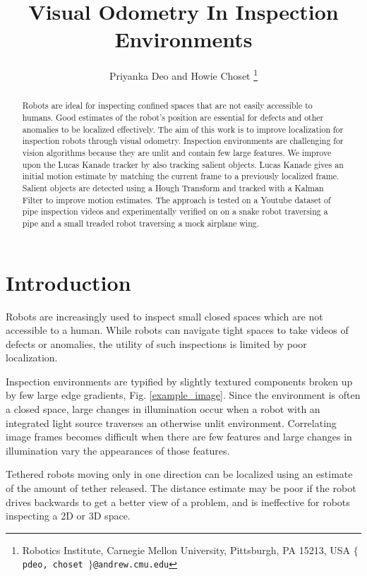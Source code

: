 \documentclass[letterpaper, 10 pt, conference]{ieeeconf}
\title{\LARGE \bf Visual Odometry In Inspection Environments}
\author{Priyanka Deo and Howie Choset%
\thanks{Robotics Institute,
Carnegie Mellon University,
Pittsburgh, PA 15213, USA
{\tt\small $\lbrace$ pdeo, choset $\rbrace$@andrew.cmu.edu}}%
}
\begin{document}
\maketitle
\thispagestyle{empty}
\pagestyle{empty}


\begin{abstract}

Robots are ideal for inspecting confined spaces that are not easily accessible to humans. Good estimates of the robot's position are essential for defects and other anomalies to be localized effectively. The aim of this work is to improve localization for inspection robots through visual odometry. Inspection environments are challenging for vision algorithms because they are unlit and contain few large features. We improve upon the Lucas Kanade tracker by also tracking salient objects. Lucas Kanade gives an initial motion estimate by matching the current frame to a previously localized frame. Salient objects are detected using a Hough Transform and tracked with a Kalman Filter to improve motion estimates. The approach is tested on a Youtube dataset of pipe inspection videos and experimentally verified on on a snake robot traversing a pipe and a small treaded robot traversing a mock airplane wing.

\end{abstract}


\section{Introduction}

Robots are increasingly used to inspect small closed spaces which are not accessible to a human. While robots can navigate tight spaces to take videos of defects or anomalies, the utility of such inspections is limited by poor localization.

Inspection environments are typified by slightly textured components broken up by few large edge gradients, Fig. \ref{example_image}. Since the environment is often a closed space, large changes in illumination occur when a robot with an integrated light source traverses an otherwise unlit environment. Correlating image frames becomes difficult when there are few features and large changes in illumination vary the appearances of those features.

Tethered robots moving only in one direction can be localized using an estimate of the amount of tether released. The distance estimate may be poor if the robot drives backwards to get a better view of a problem, and is ineffective for robots inspecting a 2D or 3D space.
\end{document}
